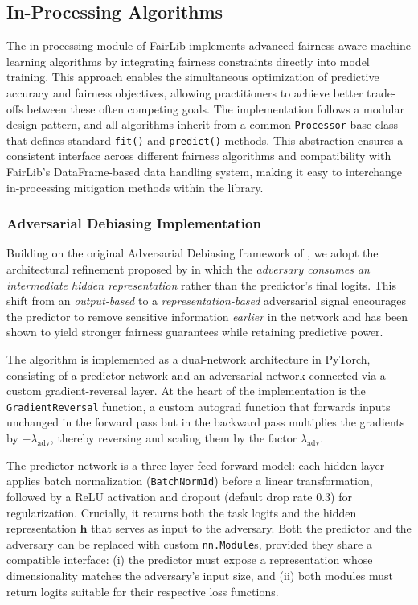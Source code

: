 \documentclass[12pt,a4paper,openright,twoside]{book}
\begin{document}
\subsection{In-Processing Algorithms}
The in-processing module of FairLib implements advanced fairness-aware machine learning algorithms by integrating fairness constraints directly into model training. This approach enables the simultaneous optimization of predictive accuracy and fairness objectives, allowing practitioners to achieve better trade-offs between these often competing goals. The implementation follows a modular design pattern, and all algorithms inherit from a common \texttt{Processor} base class that defines standard \texttt{fit()} and \texttt{predict()} methods. This abstraction ensures a consistent interface across different fairness algorithms and compatibility with FairLib’s DataFrame-based data handling system, making it easy to interchange in-processing mitigation methods within the library.
\subsubsection{Adversarial Debiasing Implementation}
Building on the original Adversarial Debiasing framework of \cite{zhang2018mitigatingunwantedbiasesadversarial}, we adopt the architectural refinement proposed by \cite{beutel2017datadecisionstheoreticalimplications} in which the \emph{adversary consumes an intermediate hidden representation} rather than the predictor’s final logits.  This shift from an \textit{output-based} to a \textit{representation-based} adversarial signal encourages the predictor to remove sensitive information \emph{earlier} in the network and has been shown to yield stronger fairness guarantees while retaining predictive power.

The algorithm is implemented as a dual-network architecture in PyTorch, consisting of a predictor network and an adversarial network connected via a custom gradient-reversal layer.  At the heart of the implementation is the \texttt{GradientReversal} function, a custom autograd function that forwards inputs unchanged in the forward pass but in the backward pass multiplies the gradients by $-\lambda_{\text{adv}}$, thereby reversing and scaling them by the factor $\lambda_{\text{adv}}$.  

The predictor network is a three-layer feed-forward model: each hidden layer applies batch normalization (\texttt{BatchNorm1d}) before a linear transformation, followed by a ReLU activation and dropout (default drop rate $0.3$) for regularization.  Crucially, it returns both the task logits and the hidden representation $\mathbf{h}$ that serves as input to the adversary.  Both the predictor and the adversary can be replaced with custom \texttt{nn.Module}s, provided they share a compatible interface: (i) the predictor must expose a representation whose dimensionality matches the adversary’s input size, and (ii) both modules must return logits suitable for their respective loss functions.
\end{document}
